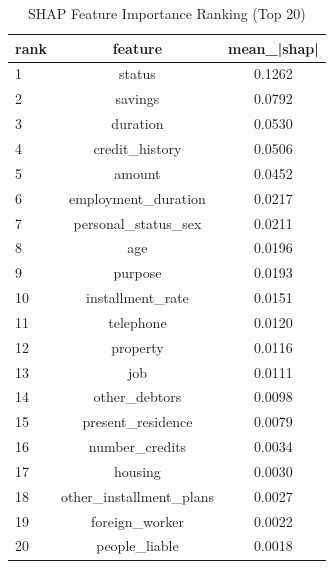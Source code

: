 \begin{table}
\centering
\caption{SHAP Feature Importance Ranking (Top 20)}
\label{tab:shap_ranking}
\begin{tabular}{lcc}
\toprule
rank & feature & mean_|shap| \\
\midrule
1 & status & 0.1262 \\
2 & savings & 0.0792 \\
3 & duration & 0.0530 \\
4 & credit_history & 0.0506 \\
5 & amount & 0.0452 \\
6 & employment_duration & 0.0217 \\
7 & personal_status_sex & 0.0211 \\
8 & age & 0.0196 \\
9 & purpose & 0.0193 \\
10 & installment_rate & 0.0151 \\
11 & telephone & 0.0120 \\
12 & property & 0.0116 \\
13 & job & 0.0111 \\
14 & other_debtors & 0.0098 \\
15 & present_residence & 0.0079 \\
16 & number_credits & 0.0034 \\
17 & housing & 0.0030 \\
18 & other_installment_plans & 0.0027 \\
19 & foreign_worker & 0.0022 \\
20 & people_liable & 0.0018 \\
\bottomrule
\end{tabular}
\end{table}
